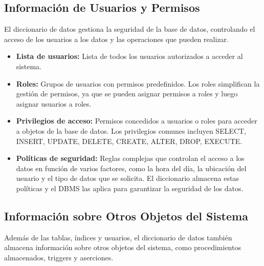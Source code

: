 \subsection{Información de Usuarios y Permisos}

El diccionario de datos gestiona la seguridad de la base de datos, controlando el acceso de los usuarios a los datos y las operaciones que pueden realizar.

\begin{itemize}
    \item \textbf{Lista de usuarios:}  Lista de todos los usuarios autorizados a acceder al sistema.
    \item \textbf{Roles:}  Grupos de usuarios con permisos predefinidos.  Los roles simplifican la gestión de permisos, ya que se pueden asignar permisos a roles y luego asignar usuarios a roles.
    \item \textbf{Privilegios de acceso:}  Permisos concedidos a usuarios o roles para acceder a objetos de la base de datos.  Los privilegios comunes incluyen SELECT, INSERT, UPDATE, DELETE, CREATE, ALTER, DROP, EXECUTE.
    \item \textbf{Políticas de seguridad:}  Reglas complejas que controlan el acceso a los datos en función de varios factores, como la hora del día, la ubicación del usuario y el tipo de datos que se solicita. El diccionario almacena estas políticas y el DBMS las aplica para garantizar la seguridad de los datos.
\end{itemize}

\subsection{Información sobre Otros Objetos del Sistema}

Además de las tablas, índices y usuarios, el diccionario de datos también almacena información sobre otros objetos del sistema, como procedimientos almacenados, triggers y aserciones.

